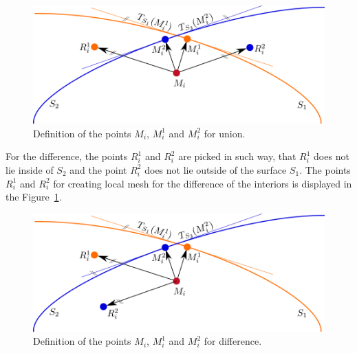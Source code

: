 \begin{figure}[h!]
    \centerline{\includegraphics[scale=0.5]{images/img75}}
    \caption[Definition of the points for union]
    {Definition of the points $M_i$, $M_i^1$ and $M_i^2$ for union.}
    \label{img:75}
\end{figure}

For the difference, the points $R_i^1$ and $R_i^2$ are picked in such way, that $R_i^1$ 
does not lie inside of $S_2$ and the point $R_i^2$ does not lie 
outside of the surface $S_1$. The points $R_i^1$ and $R_i^2$ for creating local mesh for 
the difference of the interiors is displayed in the Figure~\ref{img:75}.

\begin{figure}[h!]
    \centerline{\includegraphics[scale=0.5]{images/img76}}
    \caption[Definition of the points for difference]
    {Definition of the points $M_i$, $M_i^1$ and $M_i^2$ for difference.}
    \label{img:76}
\end{figure}
